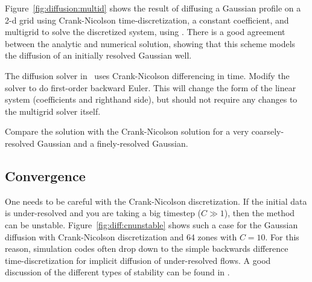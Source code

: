 Figure~\ref{fig:diffusion:multid} shows the result of diffusing a
Gaussian profile on a 2-d grid using Crank-Nicolson
time-discretization, a constant coefficient, and multigrid to solve
the discretized system, using \pyro.  There is a good agreement
between the analytic and numerical solution, showing that this scheme
models the diffusion of an initially resolved Gaussian well.


\begin{exercise}
{The diffusion solver in \pyro\ uses Crank-Nicolson differencing in time.  
Modify the solver to do first-order backward Euler.  This will change
the form of the linear system (coefficients and righthand side), but
should not require any changes to the multigrid solver itself. 

Compare the solution with the Crank-Nicolson solution for a very coarsely-resolved
Gaussian and a finely-resolved Gaussian.
}
\end{exercise}


\subsection{Convergence}

One needs to be careful with the Crank-Nicolson discretization.  If
the initial data is under-resolved and you are taking a big timestep
($C \gg 1$), then the method can be unstable.
Figure~\ref{fig:diff:cnunstable} shows such a case for the Gaussian
diffusion with Crank-Nicolson discretization and 64 zones with $C =
10$.  For this reason, simulation codes often drop down to the
simple backwards difference time-discretization for implicit diffusion
of under-resolved flows.  A good discussion of the different types
of stability can be found in \cite{leveque:fd}.

